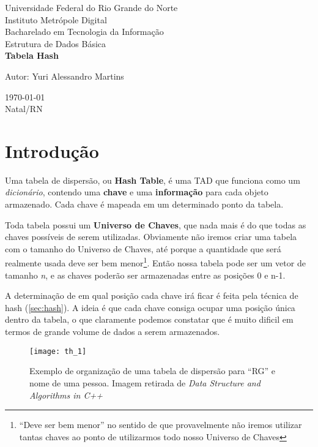 \documentclass[12pt, a4paper]{article}
\begin{document}
\begin{titlepage}
\begin{center}
{\large Universidade Federal do Rio Grande do Norte}\\[0.2cm]
{\large Instituto Metrópole Digital}\\[0.2cm]
{\large Bacharelado em Tecnologia da Informação}\\[0.2cm]
{\large Estrutura de Dados Básica}\\[5.1cm]
{\bf \huge Tabela Hash}\\[5.1cm]
\end{center}
{\large Autor: Yuri Alessandro Martins}\\[0.7cm]
\begin{center}
{\large \today}\\
{\large Natal/RN}\\[0.2cm]
\end{center}
\end{titlepage}

\tableofcontents
\clearpage

\section{Introdução}

Uma tabela de dispersão, ou \textbf{Hash Table}, é uma TAD que funciona como um \textit{dicionário}, contendo uma \textbf{chave} e uma \textbf{informação} para cada objeto armazenado. Cada chave é mapeada em um determinado ponto da tabela.

Toda tabela possui um \textbf{Universo de Chaves}, que nada mais é do que todas as chaves possíveis de serem utilizadas.  Obviamente não iremos criar uma tabela com o tamanho do Universo de Chaves, até porque a quantidade que será realmente usada deve ser bem menor\footnote{``Deve ser bem menor'' no sentido de que provavelmente não iremos utilizar tantas chaves ao ponto de utilizarmos todo nosso Universo de Chaves}. Então nossa tabela pode ser um vetor de tamanho \textit{n}, e as chaves poderão ser armazenadas entre as posições 0 e n-1.

A determinação de em qual posição cada chave irá ficar é feita pela técnica de hash (\ref{sec:hash}). A ideia é que cada chave consiga ocupar uma posição única dentro da tabela, o que claramente podemos constatar que é muito dificil em termos de grande volume de dados a serem armazenados.

\begin{figure}[!h]
\centering
\texttt{[image: th\_1]}
\caption{Exemplo de organização de uma tabela de dispersão para ``RG'' e nome de uma pessoa. Imagem retirada de \textit{Data Structure and Algorithms in C++}\cite{Weiss:1998:DSA:521187}}
\label{hash1}
\end{figure}
\end{document}
